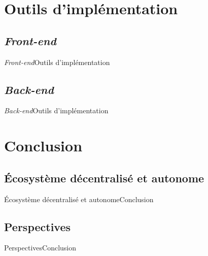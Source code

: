 \documentclass{beamer}
\begin{document}
\section{Outils d'implémentation}
\subsection{\protect\textit{Front-end}}
\begin{frame}{\textit{Front-end}}{Outils d'implémentation}
\end{frame}

\subsection{\protect\textit{Back-end}}
\begin{frame}{\textit{Back-end}}{Outils d'implémentation}
\end{frame}
\section{Conclusion}
\subsection{Écosystème décentralisé et autonome}
\begin{frame}{Écosystème décentralisé et autonome}{Conclusion}
\end{frame}

\subsection{Perspectives}
\begin{frame}{Perspectives}{Conclusion}
\end{frame}
\end{document}
